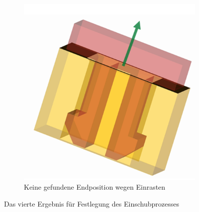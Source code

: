 \documentclass[14pt,a4paper,titlepage]{article}
\begin{document}
\begin{figure}[t!]
\begin{subfigure}{0.3\linewidth}
				\includegraphics[width=\linewidth]{result3.png}
				\caption{Keine gefundene Endposition wegen Einrasten}
			\end{subfigure}
			\caption{Das vierte Ergebnis für Festlegung des Einschubprozesses}
		\end{figure}
\end{document}
